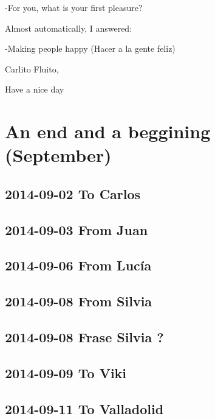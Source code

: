 \documentclass[]{book}
\begin{document}
-For you, what is your first pleasure?

Almost automatically, I answered:

-Making people happy (Hacer a la gente feliz)

Carlito Fluito,

Have a nice day

\hypertarget{end}{%
\chapter{An end and a beggining (September)}\label{end}}

\hypertarget{to-carlos-2}{%
\section{2014-09-02 To Carlos}\label{to-carlos-2}}

\hypertarget{from-juan}{%
\section{2014-09-03 From Juan}\label{from-juan}}

\hypertarget{from-lucia-5}{%
\section{2014-09-06 From Lucía}\label{from-lucia-5}}

\hypertarget{from-silvia-3}{%
\section{2014-09-08 From Silvia}\label{from-silvia-3}}

\hypertarget{frase-silvia}{%
\section{2014-09-08 Frase Silvia ?}\label{frase-silvia}}

\hypertarget{to-viki-10}{%
\section{2014-09-09 To Viki}\label{to-viki-10}}

\hypertarget{to-valladolid}{%
\section{2014-09-11 To Valladolid}\label{to-valladolid}}
\end{document}
